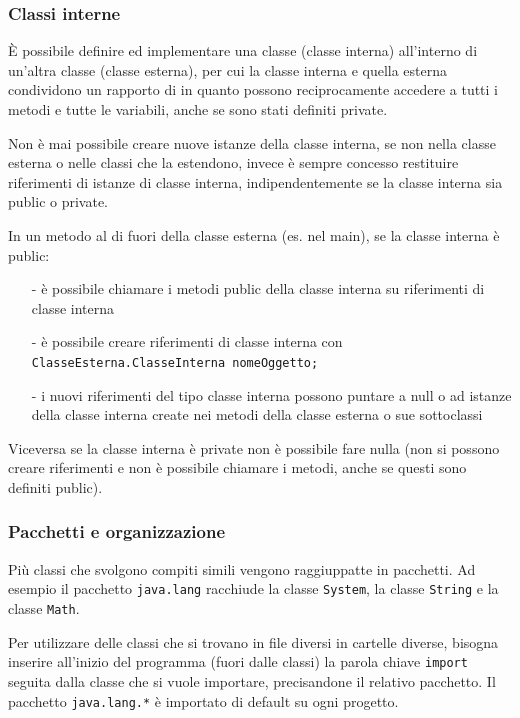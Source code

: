 \documentclass{article}
\begin{document}
\subsubsection*{Classi interne}
È possibile definire ed implementare una classe (classe interna) all'interno di un'altra classe (classe esterna), per cui la classe interna e
quella esterna condividono un rapporto di  in quanto possono reciprocamente accedere a tutti i metodi e tutte le variabili, anche
se sono stati definiti private.

Non è mai possibile creare nuove istanze della classe interna, se non nella classe esterna o nelle classi che la estendono, invece è sempre
concesso restituire riferimenti di istanze di classe interna, indipendentemente se la classe interna sia public o private.

In un metodo al di fuori della classe esterna (es. nel main), se la classe interna è public:
\begin{itemize} [topsep=3pt, itemsep=0pt]
	\item[-] è possibile chiamare i metodi public della classe interna su riferimenti di classe interna
	\item[-] è possibile creare riferimenti di classe interna con \verb|ClasseEsterna.ClasseInterna nomeOggetto;|
	\item[-] i nuovi riferimenti del tipo classe interna possono puntare a null o ad istanze della classe interna create nei metodi della classe
	esterna o sue sottoclassi
\end{itemize}

Viceversa se la classe interna è private non è possibile fare nulla (non si possono creare riferimenti e non è possibile chiamare i metodi, anche
se questi sono definiti public).

\subsubsection*{Pacchetti e organizzazione}
Più classi che svolgono compiti simili vengono raggiuppatte in pacchetti. Ad esempio il pacchetto \verb|java.lang| racchiude la classe
\verb|System|, la classe \verb|String| e la classe \verb|Math|.

Per utilizzare delle classi che si trovano in file diversi in cartelle diverse, bisogna inserire all'inizio del programma (fuori dalle classi)
la parola chiave \verb|import| seguita dalla classe che si vuole importare, precisandone il relativo pacchetto. Il pacchetto \verb|java.lang.*|
è importato di default su ogni progetto.
\end{document}

